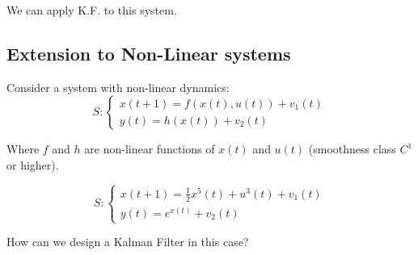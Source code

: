 \begin{remark}
    We can apply K.F. to this system.
\end{remark}

\subsection{Extension to Non-Linear systems}

Consider a system with non-linear dynamics:
\[
    S: \begin{cases}
        x(t+1) = f(x(t), u(t)) + v_1(t) \\
        y(t) = h(x(t)) + v_2(t)
    \end{cases}
\]

Where $f$ and $h$ are non-linear functions of $x(t)$ and $u(t)$ (smoothness class $C^1$ or higher).

\begin{example}
    \[
        S: \begin{cases}
            x(t+1) = \frac{1}{2} x^5(t) + u^3(t) + v_1(t) \\
            y(t) = e^{x(t)} + v_2(t)
        \end{cases}
    \]
\end{example}

How can we design a Kalman Filter in this case?


